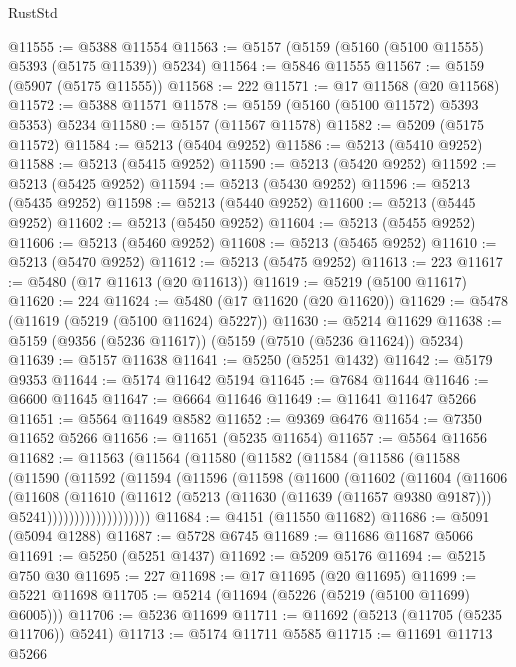 \begin{lexlean}{RustStd}
\begin{coremodule}
@11555 := @5388 @11554
@11563 := @5157 (@5159 (@5160 (@5100 @11555) @5393 (@5175 @11539)) @5234)
@11564 := @5846 @11555
@11567 := @5159 (@5907 (@5175 @11555))
@11568 := 222
@11571 := @17 @11568 (@20 @11568)
@11572 := @5388 @11571
@11578 := @5159 (@5160 (@5100 @11572) @5393 @5353) @5234
@11580 := @5157 (@11567 @11578)
@11582 := @5209 (@5175 @11572)
@11584 := @5213 (@5404 @9252)
@11586 := @5213 (@5410 @9252)
@11588 := @5213 (@5415 @9252)
@11590 := @5213 (@5420 @9252)
@11592 := @5213 (@5425 @9252)
@11594 := @5213 (@5430 @9252)
@11596 := @5213 (@5435 @9252)
@11598 := @5213 (@5440 @9252)
@11600 := @5213 (@5445 @9252)
@11602 := @5213 (@5450 @9252)
@11604 := @5213 (@5455 @9252)
@11606 := @5213 (@5460 @9252)
@11608 := @5213 (@5465 @9252)
@11610 := @5213 (@5470 @9252)
@11612 := @5213 (@5475 @9252)
@11613 := 223
@11617 := @5480 (@17 @11613 (@20 @11613))
@11619 := @5219 (@5100 @11617)
@11620 := 224
@11624 := @5480 (@17 @11620 (@20 @11620))
@11629 := @5478 (@11619 (@5219 (@5100 @11624) @5227))
@11630 := @5214 @11629
@11638 := @5159 (@9356 (@5236 @11617)) (@5159 (@7510 (@5236 @11624)) @5234)
@11639 := @5157 @11638
@11641 := @5250 (@5251 @1432)
@11642 := @5179 @9353
@11644 := @5174 @11642 @5194
@11645 := @7684 @11644
@11646 := @6600 @11645
@11647 := @6664 @11646
@11649 := @11641 @11647 @5266
@11651 := @5564 @11649 @8582
@11652 := @9369 @6476
@11654 := @7350 @11652 @5266
@11656 := @11651 (@5235 @11654)
@11657 := @5564 @11656
@11682 := @11563
    (@11564
      (@11580
        (@11582
          (@11584
            (@11586
              (@11588
                (@11590
                  (@11592
                    (@11594
                      (@11596
                        (@11598
                          (@11600
                            (@11602
                              (@11604
                                (@11606
                                  (@11608
                                    (@11610
                                      (@11612
                                        (@5213
                                          (@11630 (@11639 (@11657 @9380 @9187)))
                                          @5241)))))))))))))))))))
@11684 := @4151 (@11550 @11682)
@11686 := @5091 (@5094 @1288)
@11687 := @5728 @6745
@11689 := @11686 @11687 @5066
@11691 := @5250 (@5251 @1437)
@11692 := @5209 @5176
@11694 := @5215 @750 @30
@11695 := 227
@11698 := @17 @11695 (@20 @11695)
@11699 := @5221 @11698
@11705 := @5214 (@11694 (@5226 (@5219 (@5100 @11699) @6005)))
@11706 := @5236 @11699
@11711 := @11692 (@5213 (@11705 (@5235 @11706)) @5241)
@11713 := @5174 @11711 @5585
@11715 := @11691 @11713 @5266

\end{coremodule}
\end{lexlean}
